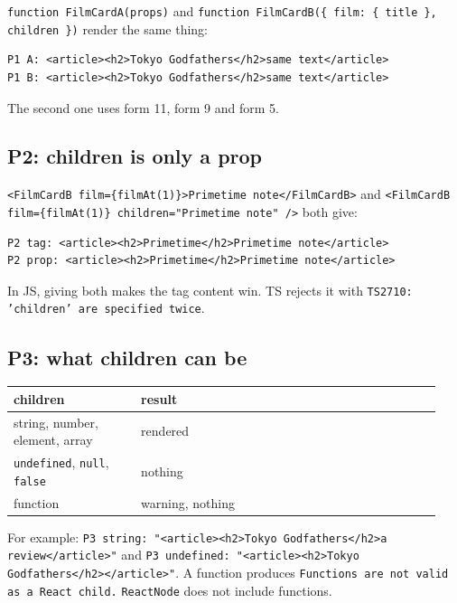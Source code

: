 \documentclass[
  11pt,
]{article}
\newcounter{none} %
\begin{document}
\texttt{function FilmCardA(props)} and
\texttt{function FilmCardB(\{ film: \{ title \}, children \})}
render the same thing:

\begin{lstlisting}
P1 A: <article><h2>Tokyo Godfathers</h2>same text</article>
P1 B: <article><h2>Tokyo Godfathers</h2>same text</article>
\end{lstlisting}

The second one uses form 11, form 9 and form 5.

\subsection{P2: children is only a
prop}\label{p2-children-is-only-a-prop}

\texttt{\textless{}FilmCardB film=\{filmAt(1)\}\textgreater{}Primetime note\textless{}/FilmCardB\textgreater{}}
and
\texttt{\textless{}FilmCardB film=\{filmAt(1)\} children="Primetime note" /\textgreater{}}
both give:

\begin{lstlisting}
P2 tag: <article><h2>Primetime</h2>Primetime note</article>
P2 prop: <article><h2>Primetime</h2>Primetime note</article>
\end{lstlisting}

In JS, giving both makes the tag content win. TS rejects it with
\texttt{TS2710: 'children' are specified twice}.

\subsection{P3: what children can be}\label{p3-what-children-can-be}

{\def\LTcaptype{none} %
\begin{longtable}[]{@{}>{\raggedright\arraybackslash}p{0.28\linewidth}>{\raggedright\arraybackslash}p{0.66\linewidth}@{}}
\toprule\noalign{}
children & result \\
\midrule\noalign{}
\endhead
\bottomrule\noalign{}
\endlastfoot
string, number, element, array & rendered \\
\texttt{undefined}, \texttt{null},
\texttt{false} & nothing \\
function & warning, nothing \\
\end{longtable}
}

For example:
\texttt{P3 string: "\textless{}article\textgreater{}\textless{}h2\textgreater{}Tokyo Godfathers\textless{}/h2\textgreater{}a review\textless{}/article\textgreater{}"}
and
\texttt{P3 undefined: "\textless{}article\textgreater{}\textless{}h2\textgreater{}Tokyo Godfathers\textless{}/h2\textgreater{}\textless{}/article\textgreater{}"}.
A function produces
\texttt{Functions are not valid as a React child.}
\texttt{ReactNode} does not include functions.
\end{document}
